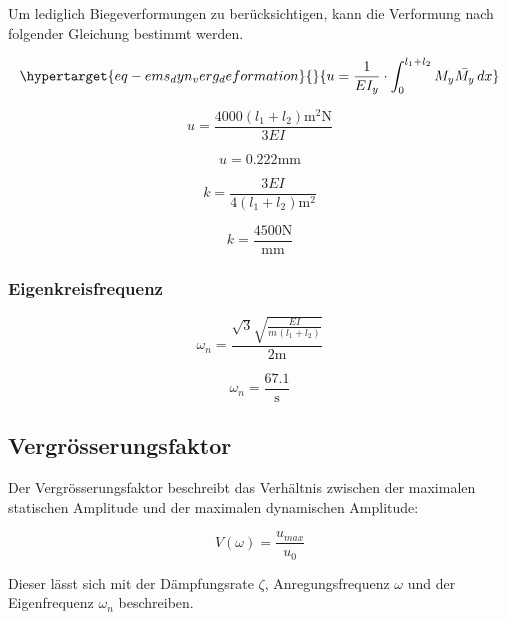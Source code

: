 \documentclass[
  letterpaper,
  DIV=11]{scrreprt}
\begin{document}
Um lediglich Biegeverformungen zu berücksichtigen, kann die Verformung
nach folgender Gleichung bestimmt werden.

\begin{equation}\protect\hypertarget{eq-ems_dyn_verg_deformation}{}{
u = \frac{1}{E I_y} \cdot \int_{0}^{l_1+l_2} M_y\bar{M_y} \,dx
}\label{eq-ems_dyn_verg_deformation}\end{equation}

\begin{equation}u = \frac{4000 \left(l_{1} + l_{2}\right) \text{m}^{2} \text{N}}{3 EI}\end{equation}

\begin{equation}u = 0.222 \text{mm}\end{equation}

\begin{equation}k = \frac{3 EI}{4 \left(l_{1} + l_{2}\right) \text{m}^{2}}\end{equation}

\begin{equation}k = \frac{4500 \text{N}}{\text{mm}}\end{equation}

\hypertarget{eigenkreisfrequenz-3}{%
\subsubsection{Eigenkreisfrequenz}\label{eigenkreisfrequenz-3}}

\begin{equation}\omega_{n} = \frac{\sqrt{3} \sqrt{\frac{EI}{m_{} \left(l_{1} + l_{2}\right)}}}{2 \text{m}}\end{equation}

\begin{equation}\omega_{n} = \frac{67.1}{\text{s}}\end{equation}

\hypertarget{vergruxf6sserungsfaktor}{%
\subsection{Vergrösserungsfaktor}\label{vergruxf6sserungsfaktor}}

Der Vergrösserungsfaktor beschreibt das Verhältnis zwischen der
maximalen statischen Amplitude und der maximalen dynamischen Amplitude:

\[V(\omega) = \frac{u_{max}}{u_0}\]

Dieser lässt sich mit der Dämpfungsrate \(\zeta\), Anregungsfrequenz
\(\omega\) und der Eigenfrequenz \(\omega_n\) beschreiben.
\end{document}
